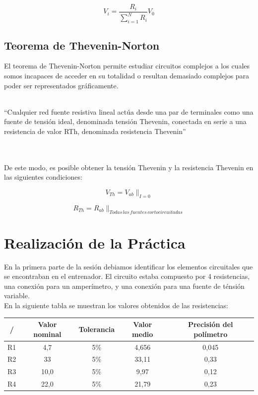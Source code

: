 \documentclass[a4paper,11pt]{article}
\begin{document}
\begin{displaymath}
V_i=\frac{R_i}{\sum_{i=1}^N R_{i}}V_0
\end{displaymath}

\subsection{Teorema de Thevenin-Norton}
El teorema de Thevenin-Norton permite estudiar circuitos complejos a los cuales somos incapaces de acceder en su totalidad o resultan demasiado complejos para poder ser representados gráficamente.\\ \\
\begin{em}
“Cualquier red fuente resistiva lineal actúa desde una par de terminales como una fuente de tensión ideal, denominada tensión Thevenin, conectada en serie a una resistencia de valor RTh, denominada resistencia Thevenin”
\end{em}\\ \\
De este modo, es posible obtener la tensión Thevenin y la resistencia Thevenin en las siguientes condiciones:


\begin{displaymath}
V_{Th}=V_{ab}\|_{I=0}
\end{displaymath}

\begin{displaymath}
R_{Th}=R_{ab}\|_{Todas\,las\,fuentes\,cortocircuitadas}
\end{displaymath}

\section{Realización de la Práctica}
En la primera parte de la sesión debiamos identificar los elementos circuitales que se encontraban en el entrenador. El circuito estaba compuesto por 4 resistencias, una conexión para un amperímetro, y una conexión para una fuente de ténsión variable.\\
En la siguiente tabla se muestran los valores obtenidos de las resistencias:\\

\begin{tabular}{|c|c|c|c|c|}
\hline 
/ & Valor nominal & Tolerancia & Valor medio & Precisión del polímetro \\ 
\hline 
R1 & 4,7 & 5\% & 4,656 & 0,045 \\ 
\hline 
R2 & 33 & 5\% & 33,11 & 0,33 \\ 
\hline 
R3 & 10,0 & 5\% & 9,97 & 0,12 \\ 
\hline 
R4 & 22,0 & 5\% & 21,79 & 0,23 \\ 
\hline 
\end{tabular}\\
\end{document}
